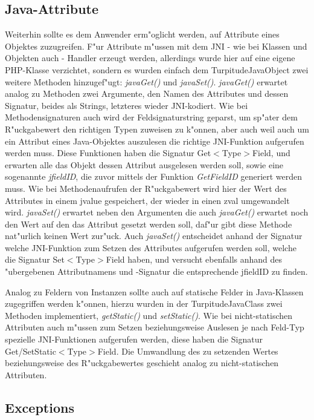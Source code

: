 \subsection{Java-Attribute}
\label{sec:chap1:impl:7}

Weiterhin sollte es dem Anwender erm"oglicht werden, auf Attribute eines Objektes zuzugreifen. F"ur Attribute m"ussen mit dem JNI - wie bei Klassen und Objekten auch -
Handler erzeugt werden, allerdings wurde hier auf eine eigene PHP-Klasse verzichtet, sondern es wurden einfach dem TurpitudeJavaObject zwei weitere Methoden hinzugef"ugt: 
\emph{javaGet()} und \emph{javaSet()}. \emph{javaGet()} erwartet analog zu Methoden zwei Argumente, den Namen des Attributes und dessen Signatur, beides als Strings, 
letzteres wieder JNI-kodiert. Wie bei Methodensignaturen auch wird der Feldsignaturstring geparst, um sp"ater dem R"uckgabewert den richtigen Typen zuweisen zu k"onnen, 
aber auch weil auch um ein Attribut eines Java-Objektes auszulesen die richtige JNI-Funktion aufgerufen werden muss. Diese Funktionen haben die Signatur
Get$<$Type$>$Field, und erwarten alle das Objekt dessen Attribut ausgelesen werden soll, sowie eine sogenannte \emph{jfieldID}, die zuvor mittels der Funktion
\emph{GetFieldID} generiert werden muss. Wie bei Methodenaufrufen der R"uckgabewert wird hier der Wert des Attributes in einem jvalue gespeichert, der wieder
in einen zval umgewandelt wird. \emph{javaSet()} erwartet neben den Argumenten die auch \emph{javaGet()} erwartet noch den Wert auf den das Attribut gesetzt werden
soll, daf"ur gibt diese Methode nat"urlich keinen Wert zur"uck. Auch \emph{javaSet()} entscheidet anhand der Signatur welche JNI-Funktion zum Setzen des
Attributes aufgerufen werden soll, welche die Signatur Set$<$Type$>$Field haben, und versucht ebenfalls anhand des "ubergebenen Attributnamens und -Signatur die
entsprechende jfieldID zu finden.

Analog zu Feldern von Instanzen sollte auch auf statische Felder in Java-Klassen zugegriffen werden k"onnen, hierzu wurden in der TurpitudeJavaClass zwei Methoden
implementiert, \emph{getStatic()} und \emph{setStatic()}. Wie bei nicht-statischen Attributen auch m"ussen zum Setzen beziehungsweise Auslesen je nach Feld-Typ spezielle 
JNI-Funktionen aufgerufen werden, diese haben die Signatur Get/SetStatic$<$Type$>$Field. Die Umwandlung des zu setzenden Wertes beziehungsweise des R"uckgabewertes
geschieht analog zu nicht-statischen Attributen.

\subsection{Exceptions}
\label{sec:chap1:impl:8}

